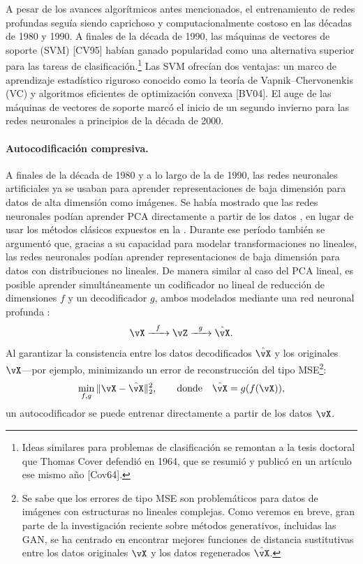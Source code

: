 \documentclass[../../book-main_es.tex]{subfiles}
\begin{document}
A pesar de los avances algorítmicos antes mencionados, el entrenamiento de redes profundas
seguía siendo caprichoso y computacionalmente costoso en las décadas de 1980 y 1990. 
A finales de la década de 1990, las máquinas de vectores de soporte (SVM) [CV95] habían ganado 
popularidad como una alternativa superior para las tareas de clasificación.\footnote{Ideas 
similares para problemas de clasificación se remontan a la tesis doctoral que Thomas Cover defendió en 1964,
que se resumió y publicó en un artículo ese mismo año [Cov64].} Las SVM ofrecían dos ventajas: 
un marco de aprendizaje estadístico riguroso conocido como la teoría de Vapnik–Chervonenkis
(VC) y algoritmos eficientes de optimización convexa [BV04]. El auge de las máquinas de vectores de 
soporte marcó el inicio de un segundo invierno para las redes neuronales a principios de la década de 2000.

\paragraph{Autocodificación compresiva.}
A finales de la década de 1980 y a lo largo de la de 1990, las redes neuronales artificiales ya se
usaban para aprender representaciones de baja dimensión para datos de alta
dimensión como imágenes. Se había mostrado que las redes neuronales podían
aprender PCA directamente a partir de los datos \cite{Oja1982SimplifiedNM,Baldi89},
en lugar de usar los métodos clásicos expuestos en la .
Durante ese período también se argumentó
que, gracias a su capacidad para modelar transformaciones no lineales,
las redes neuronales podían aprender representaciones de baja dimensión
para datos con distribuciones no lineales. De manera similar al caso del PCA
lineal, es posible aprender simultáneamente un codificador no lineal de reducción
de dimensiones \(f\) y un decodificador \(g\), ambos modelados mediante una
red neuronal profunda \cite{Rumelhart1986,Kramer1991NonlinearPC}:
\begin{equation}
    \vX   \xrightarrow{\hspace{2mm} f \hspace{2mm}} \vZ
    \xrightarrow{\hspace{2mm} g \hspace{2mm}} \hat{\vX}.
    \label{eqn:auto-encoding-deep-networks}
\end{equation}
Al garantizar la consistencia entre los datos decodificados \(\hat{\vX}\) y
los originales \(\vX\)---por ejemplo, minimizando un error de reconstrucción
del tipo MSE\footnote{Se sabe que los errores de tipo MSE son
    problemáticos para datos de imágenes con estructuras no lineales complejas. Como
    veremos en breve, gran parte de la investigación reciente sobre métodos generativos, incluidas
    las GAN, se ha centrado en encontrar mejores funciones de distancia sustitutivas
entre los datos originales \(\vX\) y los datos regenerados \(\hat{\vX}\).}:
\begin{equation}
    \min_{f,g} \|\vX - \hat{\vX}\|_{2}^{2}, \qquad \text{donde} \quad
    \hat{\vX} = g(f(\vX)),
\end{equation}
un autocodificador se puede entrenar directamente a partir de los datos \(\vX\).
\end{document}
